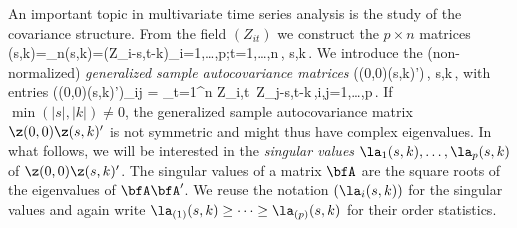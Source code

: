 An important topic in multivariate time series analysis is the study of the covariance structure. From the field $(Z_{it})$ we construct the $p\times n$ matrices
\beao
\z(s,k)=\z_n(s,k)=(Z_{i-s,t-k})_{i=1,\ldots,p;t=1,\ldots,n}\,, \quad s,k\in\Z\,.
\eeao
We introduce the (non-normalized) {\em generalized sample autocovariance matrices}  
\beao%
(\z(0,0)\z(s,k)')\,, \quad s,k\in\Z\,,
\eeao
with entries
\beao%
(\z(0,0)\z(s,k)')_{ij} = \sum_{t=1}^n Z_{i,t} \,Z_{j-s,t-k}\,,\qquad i,j=1,\ldots,p\,.
\eeao
If $\min(|s|,|k|) \neq 0$, the generalized sample autocovariance matrix $\z(0,0)\z(s,k)'$ is not symmetric and might thus have complex eigenvalues. In what follows, we will be interested in the {\em singular values} $\la_1(s,k), \ldots, \la_p(s,k)$ of $\z(0,0)\z(s,k)'$.  The singular values of a matrix $\bfA$ are the square roots of the eigenvalues of $\bfA\bfA'$. We reuse the notation $(\la_i(s,k))$ for the singular values 
and again write $\la_{(1)}(s,k)\ge \cdots  \ge\la_{(p)}(s,k)$ for their order statistics.
\par
